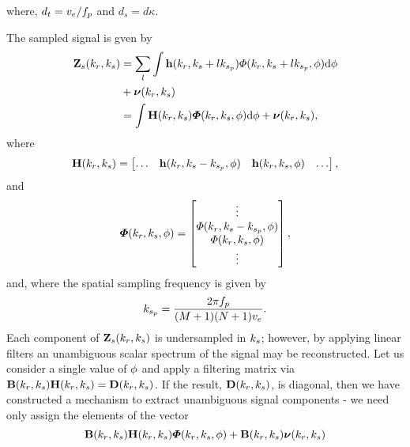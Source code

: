 \documentclass[journal]{IEEEtran}
\newcommand{\prf}{\ensuremath{f_p}}
\newcommand{\phaseSep}{\ensuremath{d}}
\newcommand{\vecsigFreqSampled}{\ensuremath{\vct{Z}_s}}
\newcommand{\temporalbaseline}{\ensuremath{d_t}}
\newcommand{\spatialbaseline}{\ensuremath{d_s}}
\begin{document}
where, $\temporalbaseline=\effrelvel/\prf$ and $\spatialbaseline=\phaseSep\kappa$.
\par
The sampled signal is gven by
\begin{equation}
\begin{split}
\vecsigFreqSampled(\kr, \kparm) &= \sum_l\int\vct{h}(\kr, \kparm+l\kparmPRF)\vkern(\kr,\kparm+l\kparmPRF,\depression)\d\depression\\ 
&+ \boldsymbol{\nu}(\kr, \kparm)\\
&=\int\antennaMatrix(\kargs)\vkernvect(\kr, \kparm, \depression)\d\depression+ \boldsymbol{\nu}(\kr, \kparm),
\end{split}
\end{equation}
where
\begin{equation}
	\antennaMatrix(\kargs)=
    \begin{bmatrix}
    	\hdots & \vct{h}(\kr, \kparm - \kparmPRF, \depression) & \vct{h}(\kr, \kparm, \depression) & \hdots
    \end{bmatrix},
\end{equation}
and
\begin{equation}
	\boldsymbol{\varPhi}(k_r, k_{s}, \phi) = 
    \begin{bmatrix}
    	\vdots\\
        \varPhi(k_r,k_{s}-k_{s_p},\phi)\\
        \varPhi(k_r,k_{s},\phi)\\
        \vdots
    \end{bmatrix},
\end{equation}
and, where the spatial sampling frequency is given by
\begin{equation}
 \kparmPRF = \frac{2\pi\prf}{(M+1)(N+1)\effrelvel}.
\end{equation}
Each component of $\vecsigFreqSampled(\kr, \kparm)$ is undersampled in $k_{s}$; however, by applying linear filters an unambiguous scalar spectrum of the signal may be reconstructed. Let us consider a single value of $\phi$ and apply a filtering matrix via $\hrwsFilterMatrix(\kargs)\antennaMatrix(\kargs)=\diagAntennaMatrix(\kargs)$. If the result, $\diagAntennaMatrix(\kargs)$, is diagonal, then we have constructed a mechanism to extract unambiguous signal components - we need only assign the elements of the vector
\begin{equation}
	\hrwsFilterMatrix(\kargs)\antennaMatrix(\kargs)\vkernvect(\kr, \kparm, \depression) + \hrwsFilterMatrix(\kargs)\boldsymbol{\nu}(\kr, \kparm)
\end{equation}
\end{document}

